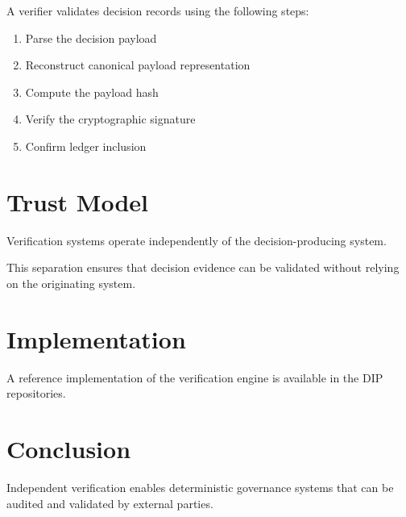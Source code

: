 \documentclass[11pt]{article}
\begin{document}
A verifier validates decision records using the following steps:

\begin{enumerate}

\item Parse the decision payload

\item Reconstruct canonical payload representation

\item Compute the payload hash

\item Verify the cryptographic signature

\item Confirm ledger inclusion

\end{enumerate}

\section{Trust Model}

Verification systems operate independently of the
decision-producing system.

This separation ensures that decision evidence can be
validated without relying on the originating system.

\section{Implementation}

A reference implementation of the verification engine
is available in the DIP repositories.

\section{Conclusion}

Independent verification enables deterministic governance
systems that can be audited and validated by external
parties.
\end{document}
